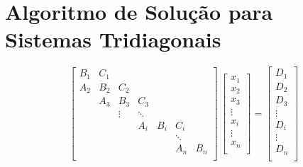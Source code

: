 \section{Algoritmo de Solução para Sistemas Tridiagonais}

\[
 \left[
 \begin{array}{lllllll}
  B_1 & C_1 &        &        &     &        &     \\
  A_2 & B_2 & C_2    &        &     &        &     \\
      & A_3 & B_3    & C_3    &     &        &     \\
      &     & \vdots & \ddots &     &        &     \\
      &     &        & A_i    & B_i & C_i    &     \\
      &     &        &        &     & \ddots &     \\
      &     &        &        &     & A_n    & B_n \\
 \end{array}
 \right]
 \,
 \left[
 \begin{array}{c}
  x_1 \\
  x_2 \\
  x_3 \\
  \vdots \\
  x_i \\
  \vdots \\
  x_n \\
 \end{array}
 \right]
 =
 \left[
 \begin{array}{c}
  D_1 \\
  D_2 \\
  D_3 \\
  \vdots \\
  D_i \\
  \vdots \\
  D_n \\
 \end{array}
 \right]
\]

\\

\\

